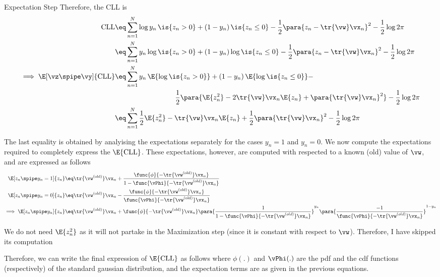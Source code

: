\documentclass{article}
\begin{document}
\begin{question}
\begin{qsubsection}{Expectation Step}
		Therefore, the CLL is
		\begin{align*}
			\text{CLL}							&\eq	\sum_{n = 1}^N \log{y_n\,\is{z_n > 0} + (1 - y_n)\,\is{z_n \le 0}} - \frac{1}{2} \para{z_n - \tr{\vw} \vx_n}^2 - \frac{1}{2} \log{2 \pi} \\
			&\eq	\sum_{n = 1}^N y_n \log{\is{z_n > 0}} + (1 - y_n) \log{\is{z_n \le 0}} - \frac{1}{2} \para{z_n - \tr{\vw} \vx_n}^2 - \frac{1}{2} \log{2 \pi} \\
			\implies \E[\vz \spipe \vy]{\text{CLL}}	&\eq	\sum_{n = 1}^N y_n\,\E{\log{\is{z_n > 0}}} + (1 - y_n)\,\E{\log{\is{z_n \le 0}}} - \\ &\hspace{3cm} \frac{1}{2} \para{\E{z_n^2} - 2 \tr{\vw} \vx_n \E{z_n} + \para{\tr{\vw} \vx_n}^2} - \frac{1}{2} \log{2 \pi} \\
			&\eq	\sum_{n = 1}^N \frac{1}{2} \E{z_n^2} - \tr{\vw} \vx_n \E{z_n} + \frac{1}{2} \para{\tr{\vw} \vx_n}^2 - \frac{1}{2} \log{2 \pi}
		\end{align*}

		The last equality is obtained by analyising the expectations separately for the cases $y_n = 1$ and $y_n = 0$. We now compute the expectations required to completely express the $\E{\text{CLL}}$. These expectations, however, are computed with respected to a known (old) value of $\vw$, and are expressed as follows
		\begin{align*}
			\E[z_n \spipe y_n = 1]{z_n}		&\eq	\tr{\vw^{(\text{old})}} \vx_n + \frac{\func{\phi}{- \tr{\vw^{(\text{old})}} \vx_n}}{1 - \func{\vPhi}{- \tr{\vw^{(\text{old})}} \vx_n}} \\
			\E[z_n \spipe y_n = 0]{z_n}		&\eq	\tr{\vw^{(\text{old})}} \vx_n - \frac{\func{\phi}{- \tr{\vw^{(\text{old})}} \vx_n}}{\func{\vPhi}{- \tr{\vw^{(\text{old})}} \vx_n}} \\
			\implies \E[z_n \spipe y_n]{z_n}		&\eq	\tr{\vw^{(\text{old})}} \vx_n + \func{\phi}{- \tr{\vw^{(\text{old})}} \vx_n} \para{\frac{1}{1 - \func{\vPhi}{- \tr{\vw^{(old)}} \vx_n}}}^{y_n} \para{\frac{-1}{\func{\vPhi}{- \tr{\vw^{(old)}} \vx_n}}}^{1 - y_n}
		\end{align*}

		\begin{note}
			We do not need $\E{z_n^2}$ as it will not partake in the Maximization step (since it is constant with respect to $\vw$). Therefore, I have skipped its computation
		\end{note}

		Therefore, we can write the final expression of $\E{\text{CLL}}$ as follows
		where $\phi(.)$ and $\vPhi(.)$ are the pdf and the cdf functions (respectively) of the standard gaussian distribution, and the expectation terms are as given in the previous equations.


\end{qsubsection}
\end{question}
\end{document}
